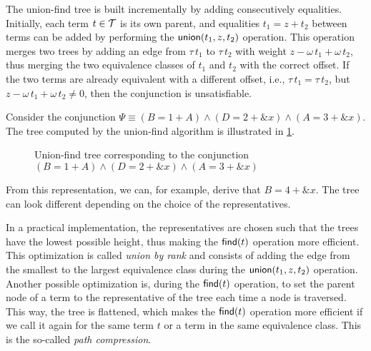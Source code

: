 The union-find tree is built incrementally by adding consecutively equalities.
Initially, each term $t\in\mathcal{T}$ is its own parent, and equalities $t_1 = z + t_2$ between terms can be added by performing the $\textsf{union}(t_1, z, t_2)$ operation.
This operation merges two trees by adding an edge from $\tau\,t_1$ to $\tau\,t_2$ with weight $z - \omega\,t_1 + \omega\,t_2$,
thus merging the two equivalence classes of $t_1$ and $t_2$ with the correct offset.
If the two terms are already equivalent with a different offset, i.e., $\tau\,t_1 = \tau\,t_2$, but $z - \omega\,t_1 + \omega\,t_2 \neq 0$, then the conjunction is unsatisfiable.

\begin{example}
  Consider the conjunction $\Psi \equiv (B = 1 + A) \land (D = 2 + \&x) \land (A = 3 + \&x)$.
  The tree computed by the union-find algorithm is illustrated in \cref{fig:uf-tree}.
  \begin{figure}
    \caption{Union-find tree corresponding to the conjunction  $(B = 1 + A) \land (D = 2 + \&x) \land (A = 3 + \&x)$}\label{fig:uf-tree}
  \end{figure}
  From this representation, we can, for example, derive that $B = 4 + \&x$.
  The tree can look different depending on the choice of the representatives.
\end{example}

In a practical implementation, the representatives are chosen such that the trees have the lowest possible height, thus making the $\textsf{find}(t)$ operation more efficient.
This optimization is called \emph{union by rank} and consists of adding the edge from the smallest to the largest equivalence class during the $\textsf{union}(t_1, z, t_2)$ operation.
Another possible optimization is, during the $\textsf{find}(t)$ operation, to set the parent node of a term to the representative of the tree each time a node is traversed.
This way, the tree is flattened, which makes the $\textsf{find}(t)$ operation
more efficient if we call it again for the same term $t$ or a term in the same equivalence class.
This is the so-called \emph{path compression}.~\cite{uf-tarjan}

